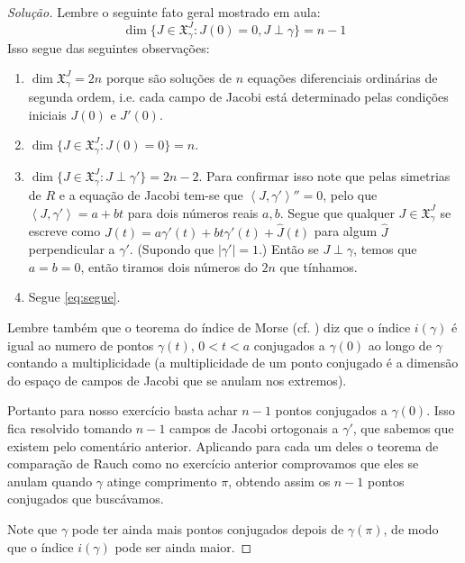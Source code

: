 \begin{proof}[Solução]\leavevmode
Lembre o seguinte fato geral mostrado em aula:
	\begin{equation}\label{eq:segue}\dim\{J \in \mathfrak{X}^J_\gamma:J(0)=0, J \perp \gamma\}=n-1\end{equation}
Isso segue das seguintes observações:
\begin{enumerate}[label=(\alph*)]
\item \(\dim\mathfrak{X}^J_\gamma=2n\) porque são soluções de \(n\) equações diferenciais ordinárias de segunda ordem, i.e. cada campo de Jacobi está determinado pelas condições iniciais \(J(0)\) e \(J'(0)\). 
\item \(\dim \{J \in \mathfrak{X}^J_\gamma:J(0)=0\}=n\).
\item \(\dim \{J \in \mathfrak{X}^J_\gamma:J\perp \gamma'\}=2n-2\). Para confirmar isso note que pelas simetrias de \(R\) e a equação de Jacobi tem-se que \(\left<J,\gamma'\right>''=0\), pelo que \(\left<J,\gamma'\right>=a+bt\) para dois números reais \(a,b\). Segue que qualquer \(J \in \mathfrak{X}^J_\gamma\) se escreve como \(J(t)=a\gamma'(t)+bt\gamma'(t)+\hat{J}(t)\) para algum \(\hat{J}\) perpendicular a  \(\gamma'\). (Supondo que \(|\gamma'|=1\).) Então se \(J \perp \gamma\), temos que  \(a=b=0\), então tiramos dois números do \(2n\) que tínhamos.
\item Segue \cref{eq:segue}.
\end{enumerate}
Lembre também que o teorema do índice de Morse (cf. \cite{doc}) diz que o índice \(i(\gamma)\) é igual ao numero de pontos \(\gamma(t)\), \(0<t<a\) conjugados a \(\gamma(0)\) ao longo de \(\gamma\) contando a multiplicidade (a multiplicidade de um ponto conjugado é a dimensão do espaço de campos de Jacobi que se anulam nos extremos).

Portanto para nosso exercício basta achar \(n-1\) pontos conjugados a \(\gamma(0)\). Isso fica resolvido tomando \(n-1\) campos de Jacobi ortogonais a \(\gamma'\), que sabemos que existem pelo comentário anterior. Aplicando para cada um deles o teorema de comparação de Rauch como no exercício anterior comprovamos que eles se anulam quando \(\gamma\) atinge comprimento \(\pi\), obtendo assim os \(n-1\) pontos conjugados que buscávamos.

Note que \(\gamma\) pode ter ainda mais pontos conjugados depois de \(\gamma(\pi)\), de modo que o índice \(i(\gamma)\) pode ser ainda maior.
\end{proof}

